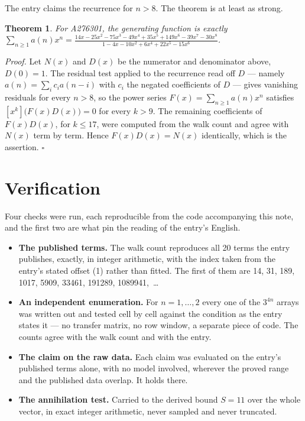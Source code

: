 \documentclass[11pt]{article}
\newtheorem{theorem}{Theorem}
\theoremstyle{definition}
\begin{document}
The entry claims the recurrence for $n > 8$. The theorem is at least as strong.

\begin{theorem} For A276301, the generating function is exactly $\sum_{n\ge 1} a(n)x^n = \frac{14x - 25x^{2} - 75x^{3} - 49x^{4} + 35x^{5} + 149x^{6} - 39x^{7} - 30x^{8}}{1 - 4x - 10x^{2} + 6x^{4} + 22x^{5} - 15x^{6}}$.\end{theorem}

{\itshape Proof.} Let $N(x)$ and $D(x)$ be the numerator and denominator above, $D(0)=1$. The residual test applied to the recurrence read off $D$ --- namely $a(n) = \sum_i c_i a(n-i)$ with $c_i$ the negated coefficients of $D$ --- gives vanishing residuals for every $n > 8$, so the power series $F(x)=\sum_{n\ge 1}a(n)x^n$ satisfies $[x^k]\bigl(F(x)D(x)\bigr) = 0$ for every $k > 9$. The remaining coefficients of $F(x)D(x)$, for $k \le 17$, were computed from the walk count and agree with $N(x)$ term by term. Hence $F(x)D(x) = N(x)$ identically, which is the assertion. $\square$

\section{Verification}

Four checks were run, each reproducible from the code accompanying this note, and the first two are what pin the reading of the entry's English.

\begin{itemize}

\item {\bfseries The published terms.} The walk count reproduces all 20 terms the entry publishes, exactly, in integer arithmetic, with the index taken from the entry's stated offset (1) rather than fitted. The first of them are 14, 31, 189, 1017, 5909, 33461, 191289, 1089941,~\dots

\item {\bfseries An independent enumeration.} For $n = 1,\dots,2$ every one of the $3^{4n}$ arrays was written out and tested cell by cell against the condition as the entry states it --- no transfer matrix, no row window, a separate piece of code. The counts agree with the walk count and with the entry.

\item {\bfseries The claim on the raw data.} Each claim was evaluated on the entry's published terms alone, with no model involved, wherever the proved range and the published data overlap. It holds there.

\item {\bfseries The annihilation test.} Carried to the derived bound $S = 11$ over the whole vector, in exact integer arithmetic, never sampled and never truncated.

\end{itemize}
\end{document}
